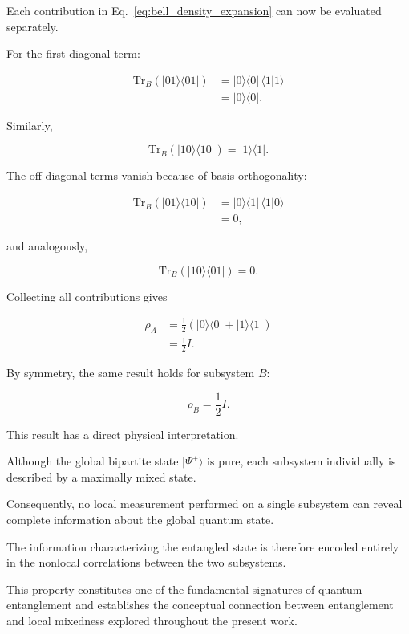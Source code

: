 Each contribution in Eq.~\eqref{eq:bell_density_expansion} can now be evaluated separately.

\medskip

For the first diagonal term:

\begin{align}
\mathrm{Tr}_B
\left(
|01\rangle \langle 01|
\right)
&=
|0\rangle \langle 0|
\,
\langle 1|1\rangle
\nonumber
\\
&=
|0\rangle \langle 0|.
\end{align}

Similarly,

\begin{equation}
\mathrm{Tr}_B
\left(
|10\rangle \langle 10|
\right)
=
|1\rangle \langle 1|.
\end{equation}

The off-diagonal terms vanish because of basis orthogonality:

\begin{align}
\mathrm{Tr}_B
\left(
|01\rangle \langle 10|
\right)
&=
|0\rangle \langle 1|
\,
\langle 1|0\rangle
\nonumber
\\
&=
0,
\end{align}

and analogously,

\begin{equation}
\mathrm{Tr}_B
\left(
|10\rangle \langle 01|
\right)
=
0.
\end{equation}

Collecting all contributions gives

\begin{align}
\rho_A
&=
\frac{1}{2}
\left(
|0\rangle \langle 0|
+
|1\rangle \langle 1|
\right)
\nonumber
\\
&=
\frac{1}{2} I.
\label{eq:reduced_density_maximally_mixed}
\end{align}

By symmetry, the same result holds for subsystem \( B \):

\begin{equation}
\rho_B
=
\frac{1}{2} I.
\label{eq:reduced_density_B_maximally_mixed}
\end{equation}

\medskip

This result has a direct physical interpretation.

Although the global bipartite state \( |\Psi^+\rangle \) is pure, each subsystem individually is described by a maximally mixed state.

Consequently, no local measurement performed on a single subsystem can reveal complete information about the global quantum state.

The information characterizing the entangled state is therefore encoded entirely in the nonlocal correlations between the two subsystems.

\medskip

This property constitutes one of the fundamental signatures of quantum entanglement and establishes the conceptual connection between entanglement and local mixedness explored throughout the present work.

